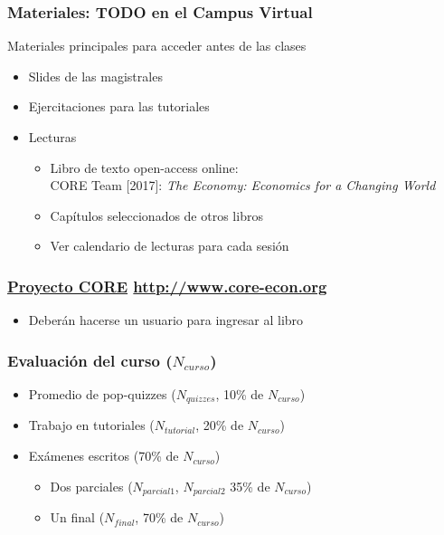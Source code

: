 \documentclass[14pt]{beamer}
\begin{document}
\begin{frame}
\frametitle{Materiales: TODO en el Campus Virtual}
Materiales principales para acceder antes de las clases
\begin{itemize}
    \item Slides de las magistrales
    \item Ejercitaciones para las tutoriales
    \item Lecturas
    \begin{itemize}
        \item Libro de texto open-access online: \\
        CORE Team [2017]:  \textit{The Economy: Economics for a Changing World}
        \item Capítulos seleccionados de otros libros
        \item Ver calendario de lecturas para cada sesión
        \end{itemize}
\end{itemize}
\end{frame}

\begin{frame}
\frametitle{\href{http://www.core-econ.org}{Proyecto CORE} \url{http://www.core-econ.org}}
\begin{itemize}
    \item Deberán hacerse un usuario para ingresar al libro
\end{itemize}
\end{frame}

\begin{frame}
\frametitle{Evaluación del curso ($N_{curso}$)}
\begin{itemize}
    \item Promedio de pop-quizzes ($N_{quizzes}$, 10\% de $N_{curso}$) \vspace{2mm}
    \item Trabajo en tutoriales ($N_{tutorial}$, 20\% de $N_{curso}$) \vspace{2mm}
    \item Exámenes escritos (70\% de $N_{curso}$)
    \begin{itemize} \vspace{2mm}
        \item Dos parciales ($N_{parcial 1}$, $N_{parcial 2}$ 35\% de $N_{curso}$) \vspace{2mm}
        \item Un final ($N_{final}$, 70\% de $N_{curso}$)
    \end{itemize}    
\end{itemize}
\end{frame}
\end{document}
